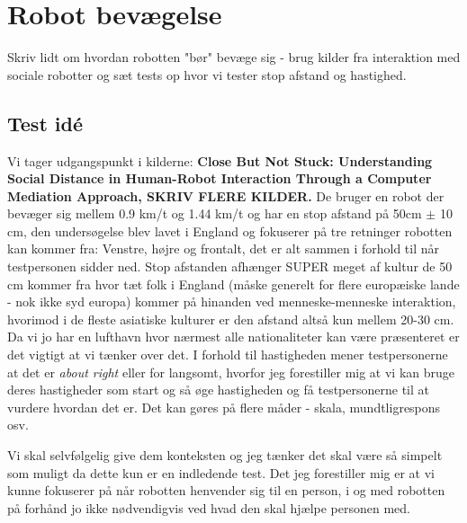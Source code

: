 \chapter{Robot bevægelse}
\label{TestAfSkalaRobotBevaegelse}
%
Skriv lidt om hvordan robotten "bør" bevæge sig - brug kilder fra interaktion med sociale robotter og sæt tests op hvor vi tester stop afstand og hastighed. \blankline
%
\section{Test idé}
%
Vi tager udgangspunkt i kilderne:\textbf{ Close But Not Stuck:
Understanding Social Distance in Human-Robot Interaction Through a Computer Mediation Approach, SKRIV FLERE KILDER.} De bruger en robot der bevæger sig mellem 0.9 km/t og 1.44 km/t og har en stop afstand på 50cm $\pm$ 10 cm, den undersøgelse blev lavet i England og fokuserer på tre retninger robotten kan kommer fra: Venstre, højre og frontalt, det er alt sammen i forhold til når testpersonen sidder ned. Stop afstanden afhænger SUPER meget af kultur de 50 cm kommer fra hvor tæt folk i England (måske generelt for flere europæiske lande - nok ikke syd europa) kommer på hinanden ved menneske-menneske interaktion, hvorimod i de fleste asiatiske kulturer er den afstand altså kun mellem 20-30 cm. Da vi jo har en lufthavn hvor nærmest alle nationaliteter kan være præsenteret er det vigtigt at vi tænker over det. I forhold til hastigheden mener testpersonerne at det er \textit{about right} eller for langsomt, hvorfor jeg forestiller mig at vi kan bruge deres hastigheder som start og så øge hastigheden og få testpersonerne til at vurdere hvordan det er. Det kan gøres på flere måder - skala, mundtligrespons osv. 

Vi skal selvfølgelig give dem konteksten og jeg tænker det skal være så simpelt som muligt da dette kun er en indledende test. Det jeg forestiller mig er at vi kunne fokuserer på når robotten henvender sig til en person, i og med robotten på forhånd jo ikke nødvendigvis ved hvad den skal hjælpe personen med. 

